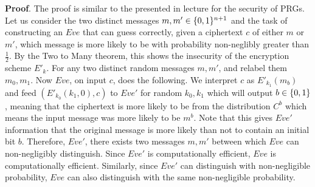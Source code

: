 \documentclass{article}
\begin{document}
\begin{enumerate}[,start=6]
\begin{mdbmarginx}{1ex}{0pt}{1ex}{0pt}%
\noindent{}\textbf{Proof}.  The proof is similar to the presented in lecture for the security of PRGs. Let us consider the two
distinct messages $m, m' \in \{0,1\} ^ {n+1}$ and the task of constructing an $Eve$ that can guess correctly,
given a ciphertext $c$ of either $m$ or $m'$, which message is more likely to be with probability
non-neglibly greater than $\frac{1}{2}$. By the Two to Many theorem, this shows the insecurity of the
encryption scheme $E'_k$.
For any two distinct random messages $m,m'$, and relabel them $m_0,m_1$. Now $Eve$, on input $c$, does the following. 
We interpret $c$ as $E'_{k_1}(m_b)$ and feed 
$(E'_{k_0}(k_1,0), c)$ to $Eve'$ for random $k_0,k_1$ 
which will output $b \in \{0,1\}$, meaning that the ciphertext is more likely to be from the distribution 
$C^b$ which means the input message was more likely to be $m^b$. Note that this gives $Eve'$ information
that the original message is more likely than not to contain an initial bit $b$. Therefore, $Eve'$, 
there exists two messages $m,m'$ between which $Eve$ can non-negligibly distinguish. Since $Eve'$ is 
computationally efficient, $Eve$ is computationally efficient. Similarly, since $Eve'$ can distinguish
with non-negligible probability, $Eve$ can also distinguish with the same non-negligible probability.%
\end{mdbmarginx}%

\mdfloatright{\ensuremath{\Box}}%
\end{enumerate}%
\end{document}
